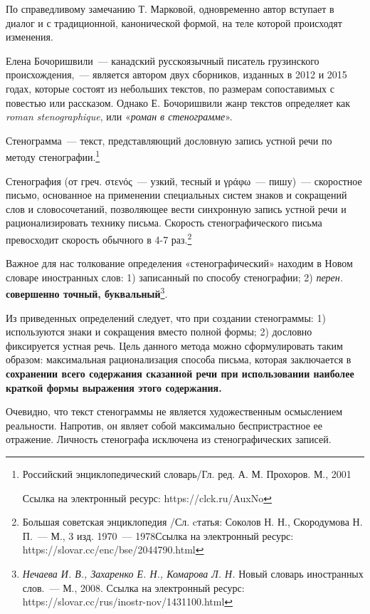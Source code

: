\documentclass{kursa4}
\begin{document}
    По справедливому замечанию Т. Марковой, одновременно автор вступает
    в диалог и с традиционной, канонической формой, на теле которой
    происходят изменения. 

    Елена Бочоришвили~--- канадский русскоязычный писатель грузинского
    происхождения,~--- является автором двух сборников, изданных в 2012 и
    2015 годах, которые состоят из небольших текстов, по размерам
    сопоставимых с повестью или рассказом. Однако Е. Бочоришвили жанр
    текстов определяет как \textit{roman stenographique}, или
    «\textit{роман в стенограмме}». 

    {Стенограмма~--- текст, представляющий дословную
    запись устной речи по методу
    стенографии.}\footnote{{Российский энциклопедический
    словарь/Гл. ред. А. М. Прохоров. М., 2001 }\par
    {Ссылка на электронный ресурс:
    https://clck.ru/AuxNo}}

    {Стенография}\textbf{{ }}(от греч.
    στενός~--- узкий, тесный и γράφω~--- пишу)~--- скоростное письмо, основанное
    на применении специальных систем знаков и сокращений слов и
    словосочетаний, позволяющее вести синхронную запись устной речи и
    рационализировать технику письма. Скорость стенографического письма
    превосходит скорость обычного в 4-7
    раз.\footnote{{Большая советская энциклопедия /Сл.
    cтатья: Соколов Н. Н., Скородумова Н. П.~--- М., 3 изд. 1970~--- 1978Ссылка
    на электронный ресурс: https://slovar.cc/enc/bse/2044790.html}}

    Важное для нас толкование определения «стенографический» находим в Новом
    словаре иностранных слов{: }1) записанный по способу
    стенографии; 2) \textit{перен.} \textbf{совершенно точный,
    буквальный}\footnote{\textit{{Нечаева И. В., Захаренко
    Е. Н., Комарова Л. Н. }}{Новый словарь иностранных
    слов.~--- М., 2008. Ссылка на электронный ресурс:
    https://slovar.cc/rus/inostr-nov/1431100.html}}. 

    Из приведенных определений следует, что при создании стенограммы: 1)
    используются знаки и сокращения вместо полной формы; 2) дословно
    фиксируется устная речь. Цель данного метода можно сформулировать таким
    образом: максимальная рационализация способа письма, которая
    заключается в \textbf{сохранении всего содержания сказанной речи при
    использовании наиболее краткой формы выражения этого содержания.} 

    Очевидно, что текст стенограммы не является художественным
    осмыслением реальности. Напротив, он являет собой максимально
    беспристрастное ее отражение. Личность стенографа исключена из
    стенографических записей. 
\end{document}

